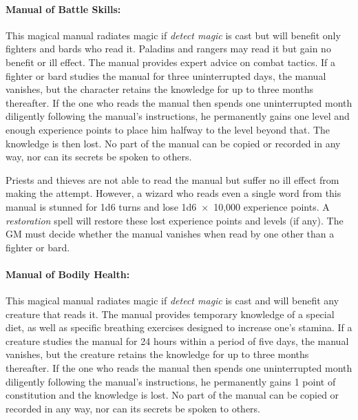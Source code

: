 \begin{multicols}{2}
\paragraph{Manual of Battle Skills:} This magical manual radiates magic if \textit{detect magic} is cast but will benefit only fighters and bards who read it.  Paladins and rangers may read it but gain no benefit or ill effect.  The manual provides expert advice on combat tactics.  If a fighter or bard studies the manual for three uninterrupted days, the manual vanishes, but the character retains the knowledge for up to three months thereafter.  If the one who reads the manual then spends one uninterrupted month diligently following the manual's instructions, he permanently gains one level and enough experience points to place him halfway to the level beyond that.  The knowledge is then lost.  No part of the manual can be copied or recorded in any way, nor can its secrets be spoken to others.  

Priests and thieves are not able to read the manual but suffer no ill effect from making the attempt.  However, a wizard who reads even a single word from this manual is stunned for 1d6 turns and lose 1d6~$\times$~10,000 experience points.  A \textit{restoration} spell will restore these lost experience points and levels (if any).  The GM must decide whether the manual vanishes when read by one other than a fighter or bard.

\paragraph{Manual of Bodily Health:} This magical manual radiates magic if \textit{detect magic} is cast and will benefit any creature that reads it.  The manual provides temporary knowledge of a special diet, as well as specific breathing exercises designed to increase one's stamina.  If a creature studies the manual for 24 hours within a period of five days, the manual vanishes, but the creature retains the knowledge for up to three months thereafter.  If the one who reads the manual then spends one uninterrupted month diligently following the manual's instructions, he permanently gains 1 point of constitution and the knowledge is lost.  No part of the manual can be copied or recorded in any way, nor can its secrets be spoken to others.  


\end{multicols}

